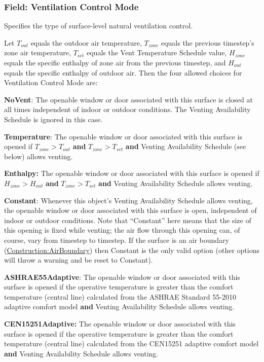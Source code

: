 \subsubsection{Field: Ventilation Control Mode}\label{field-ventilation-control-mode-1}

Specifies the type of surface-level natural ventilation control.

Let $T_{out}$ equals the outdoor air temperature, $T_{zone}$ equals the previous
timestep's zone air temperature, $T_{set}$ equals the Vent Temperature Schedule
value, $H_{zone}$ equals the specific enthalpy of zone air from the previous
timestep, and $H_{out}$ equals the specific enthalpy of outdoor air. Then the
four allowed choices for Ventilation Control Mode are:

\textbf{NoVent}: The openable window or door associated with this surface is
closed at all times independent of indoor or outdoor conditions. The
Venting Availability Schedule is ignored in this case.

\textbf{Temperature}: The openable window or door associated with this surface
is opened if $T_{zone} > T_{out}$ \textbf{and} $T_{zone} > T_{set}$ \textbf{and}
Venting Availability Schedule (see below) allows venting.

\textbf{Enthalpy:} The openable window or door associated with this surface is
opened if $H_{zone} > H_{out}$ \textbf{and} $T_{zone} > T_{set}$ \textbf{and}
Venting Availability Schedule allows venting.

\textbf{Constant}: Whenever this object's Venting Availability Schedule allows venting, the openable window or door associated with this surface is open, independent of indoor or outdoor conditions. Note that ``Constant'' here means that the size of this opening is fixed while venting; the air flow through this opening can, of course, vary from timestep to timestep. If the surface is an air boundary (\hyperref[constructionairboundary]{Construction:AirBoundary}) then Constant is the only valid option (other options will throw a warning and be reset to Constant).

\textbf{ASHRAE55Adaptive}: The openable window or door associated with this surface is opened if the operative temperature is greater than the comfort temperature (central line) calculated from the ASHRAE Standard 55-2010 adaptive comfort model \textbf{and} Venting Availability Schedule allows venting.

\textbf{CEN15251Adaptive:} The openable window or door associated with this surface is opened if the operative temperature is greater than the comfort temperature (central line) calculated from the CEN15251 adaptive comfort model \textbf{and} Venting Availability Schedule allows venting.

